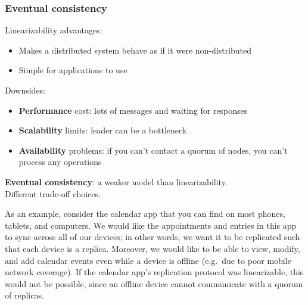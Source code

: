 \begin{frame}
    \label{s:eventual-1}
    \frametitle{Eventual consistency}
    Linearizability advantages:
    \begin{itemize}
        \item Makes a distributed system behave as if it were non-distributed
        \item Simple for applications to use\\[1em]\pause
    \end{itemize}
    Downsides:
    \begin{itemize}
        \item \textbf{Performance} cost: lots of messages and waiting for responses\pause
        \item \textbf{Scalability} limits: leader can be a bottleneck\pause
        \item \textbf{Availability} problems: if you can't contact a quorum of nodes, you can't process any operations\\[1em]\pause
    \end{itemize}
    \textbf{Eventual consistency}: a weaker model than linearizability.\\
    Different trade-off choices.
\end{frame}
\label{l:eventual-1}

As an example, consider the calendar app that you can find on most phones, tablets, and computers.
We would like the appointments and entries in this app to sync across all of our devices; in other words, we want it to be replicated such that each device is a replica.
Moreover, we would like to be able to view, modify, and add calendar events even while a device is offline (e.g.\ due to poor mobile network coverage).
If the calendar app's replication protocol was linearizable, this would not be possible, since an offline device cannot communicate with a quorum of replicas.



